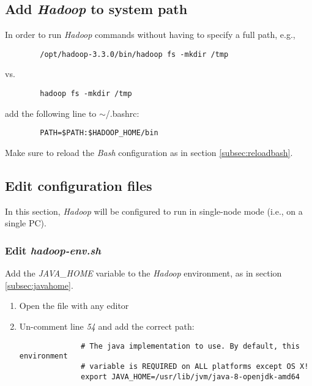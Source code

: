 \documentclass{article}
\begin{document}
    \subsection{Add \emph{Hadoop} to system path}
    In order to run \emph{Hadoop} commands without having to specify a full path, e.g.,
    \begin{verbatim}
        /opt/hadoop-3.3.0/bin/hadoop fs -mkdir /tmp
    \end{verbatim}
    vs.
    \begin{verbatim}
        hadoop fs -mkdir /tmp
    \end{verbatim}
    add the following line to $\sim$/.bashrc:
    \begin{verbatim}
        PATH=$PATH:$HADOOP_HOME/bin
    \end{verbatim}
    Make sure to reload the \emph{Bash} configuration as in section \ref{subsec:reloadbash}.

    \subsection{Edit configuration files}
    In this section, \emph{Hadoop} will be configured to run in single-node mode (i.e., on a single PC).

        \subsubsection{Edit \emph{hadoop-env.sh}}
        Add the \emph{JAVA\_HOME} variable to the \emph{Hadoop} environment, as in section \ref{subsec:javahome}.

        \begin{enumerate}
            \item Open the file  with any editor
            
            \item Un-comment line \emph{54} and add the correct path:
            \begin{verbatim}
              # The java implementation to use. By default, this environment
              # variable is REQUIRED on ALL platforms except OS X!
              export JAVA_HOME=/usr/lib/jvm/java-8-openjdk-amd64
            \end{verbatim}
        \end{enumerate}
\end{document}
